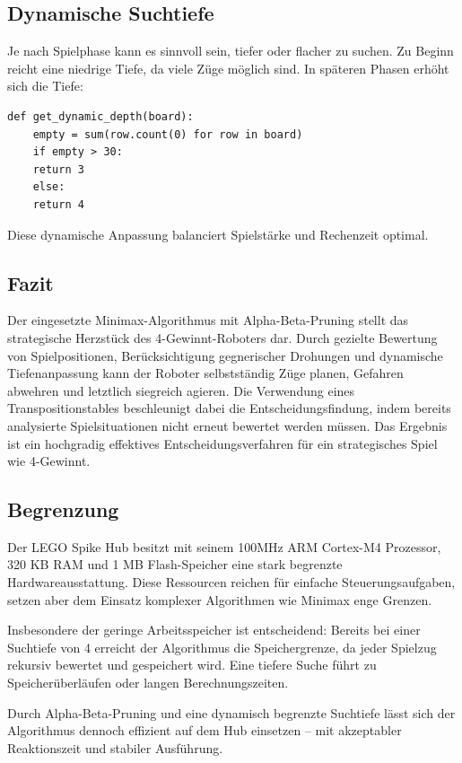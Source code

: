 \subsection{Dynamische Suchtiefe}

Je nach Spielphase kann es sinnvoll sein, tiefer oder flacher zu suchen. Zu Beginn reicht eine niedrige Tiefe, da viele Züge möglich sind. In späteren Phasen erhöht sich die Tiefe:

\begin{lstlisting}[style=pythonstyle]
	def get_dynamic_depth(board):
	empty = sum(row.count(0) for row in board)
	if empty > 30:
	return 3
	else:
	return 4
\end{lstlisting}

Diese dynamische Anpassung balanciert Spielstärke und Rechenzeit optimal.

\subsection{Fazit}

Der eingesetzte Minimax-Algorithmus mit Alpha-Beta-Pruning stellt das strategische Herzstück des 4-Gewinnt-Roboters dar. Durch gezielte Bewertung von Spielpositionen, Berücksichtigung gegnerischer Drohungen und dynamische Tiefenanpassung kann der Roboter selbstständig Züge planen, Gefahren abwehren und letztlich siegreich agieren. Die Verwendung eines Transpositionstables beschleunigt dabei die Entscheidungsfindung, indem bereits analysierte Spielsituationen nicht erneut bewertet werden müssen. Das Ergebnis ist ein hochgradig effektives Entscheidungsverfahren für ein strategisches Spiel wie 4-Gewinnt.


\subsection{Begrenzung}
Der LEGO Spike Hub besitzt mit seinem 100MHz ARM Cortex-M4 Prozessor, 320 KB RAM und 1 MB Flash-Speicher eine stark begrenzte Hardwareausstattung. Diese Ressourcen reichen für einfache Steuerungsaufgaben, setzen aber dem Einsatz komplexer Algorithmen wie Minimax enge Grenzen.

Insbesondere der geringe Arbeitsspeicher ist entscheidend: Bereits bei einer Suchtiefe von 4 erreicht der Algorithmus die Speichergrenze, da jeder Spielzug rekursiv bewertet und gespeichert wird. Eine tiefere Suche führt zu Speicherüberläufen oder langen Berechnungszeiten.

Durch Alpha-Beta-Pruning und eine dynamisch begrenzte Suchtiefe lässt sich der Algorithmus dennoch effizient auf dem Hub einsetzen – mit akzeptabler Reaktionszeit und stabiler Ausführung.
